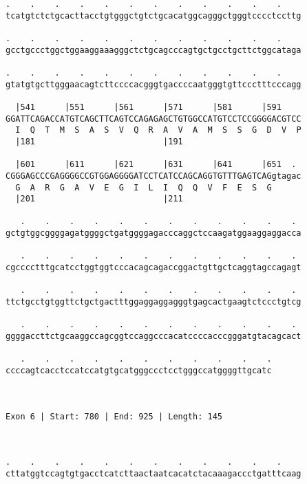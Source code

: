 \documentclass{article}
\begin{document}
\begin{Verbatim}
.    .    .    .    .    .    .    .    .    .    .    .    
tcatgtctctgcacttacctgtgggctgtctgcacatggcagggctgggtcccctccttg
                                                            
.    .    .    .    .    .    .    .    .    .    .    .    
gcctgccctggctggaaggaaagggctctgcagcccagtgctgcctgcttctggcataga
                                                            
.    .    .    .    .    .    .    .    .    .    .    .    
gtatgtgcttgggaacagtcttccccacgggtgaccccaatgggtgttccctttcccagg
                                                            
  |541      |551      |561      |571      |581      |591    
GGATTCAGACCATGTCAGCTTCAGTCCAGAGAGCTGTGGCCATGTCCTCCGGGGACGTCC
  I  Q  T  M  S  A  S  V  Q  R  A  V  A  M  S  S  G  D  V  P
  |181                          |191                        
  
  |601      |611      |621      |631      |641      |651  . 
CGGGAGCCCGAGGGGCCGTGGAGGGGATCCTCATCCAGCAGGTGTTTGAGTCAGgtagac
  G  A  R  G  A  V  E  G  I  L  I  Q  Q  V  F  E  S  G      
  |201                          |211                        
  
   .    .    .    .    .    .    .    .    .    .    .    . 
gctgtggcggggagatggggctgatggggagacccaggctccaagatggaaggaggacca
                                                            
   .    .    .    .    .    .    .    .    .    .    .    . 
cgcccctttgcatcctggtggtcccacagcagaccggactgttgctcaggtagccagagt
                                                            
   .    .    .    .    .    .    .    .    .    .    .    . 
ttctgcctgtggttctgctgactttggaggaggagggtgagcactgaagtctccctgtcg
                                                            
   .    .    .    .    .    .    .    .    .    .    .    . 
ggggaccttctgcaaggccagcggtccaggcccacatccccacccgggatgtacagcact
                                                            
   .    .    .    .    .    .    .    .    .    .    .
ccccagtcacctccatccatgtgcatgggccctcctgggccatggggttgcatc
                                                      
                                                      
 
Exon 6 | Start: 780 | End: 925 | Length: 145



.    .    .    .    .    .    .    .    .    .    .    .    
cttatggtccagtgtgacctcatcttaactaatcacatctacaaagaccctgatttcaag
                                                            

\end{Verbatim}
\end{document}
